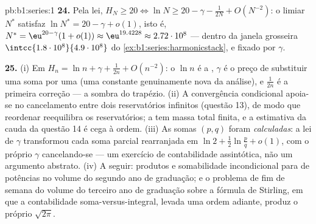 \begin{solution}{pb:b1:series:1}
\textbf{24.} Pela lei, $H_N \geq 20 \iff \ln N \geq 20 -
\gamma - \frac{1}{2N} + O(N^{-2})$: o limiar $N^*$
satisfaz $\ln N^* = 20 - \gamma + o(1)$, isto é, $N^* =
\eu^{20 - \gamma}(1 + o(1)) \approx \eu^{19.4228} \approx
2.72\cdot10^{8}$ --- dentro da janela grosseira
$\intcc{1.8\cdot10^8}{4.9\cdot10^8}$ do
\cref{ex:b1:series:harmonicstack}, e fixado por $\gamma$.

\textbf{25.} (i) Em $H_n = \ln n + \gamma + \frac{1}{2n} +
O(n^{-2})$: o $\ln n$ é a , $\gamma$ é o
preço de substituir uma soma por uma  (uma constante
genuinamente nova da análise), e $\frac{1}{2n}$ é a primeira correção --- a
sombra do trapézio. (ii) A convergência condicional apoia-se no
cancelamento entre dois reservatórios infinitos (questão 13), de
modo que reordenar reequilibra os reservatórios; a  tem massa total finita, e a estimativa da cauda da
questão 14 é cega à ordem. (iii) As somas $(p,q)$ foram
\emph{calculadas}: a lei de $\gamma$ transformou cada soma parcial
rearranjada em $\ln 2 +
\frac12\ln\frac pq + o(1)$, com o próprio $\gamma$ cancelando-se ---
um exercício de contabilidade assintótica, não um argumento
abstrato. (iv) A seguir: produtos e somabilidade incondicional
para  de potências no volume do segundo ano de graduação;
e o problema de fim de semana do volume do terceiro ano de
graduação sobre a fórmula de Stirling, em que a contabilidade
soma-versus-integral, levada uma ordem adiante, produz o próprio
$\sqrt{2\pi}$.
\end{solution}
